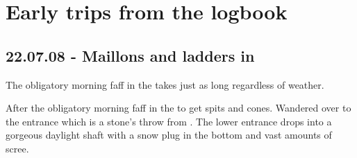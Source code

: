 \section{Early trips from the logbook}

\subsection{22.07.08 - Maillons and ladders in \protect{}}


\begin{marginfigure}
\checkoddpage \ifoddpage \forcerectofloat \else \forceversofloat \fi
\centering
 \caption{The obligatory morning faff in the \protect{} takes just as long regardless of weather. }
 \label{sunny morning bivi}
\end{marginfigure}


After the obligatory morning faff in the   to get spits and cones.
Wandered over to the entrance which is a stone's throw from .
The lower entrance drops into a gorgeous daylight shaft with a snow plug
in the bottom and vast amounts of scree.

